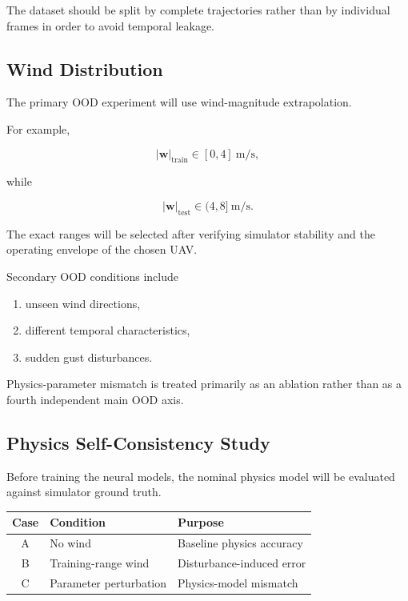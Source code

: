 \documentclass[conference]{IEEEtran}
\begin{document}
The dataset should be split by complete trajectories rather than by
individual frames in order to avoid temporal leakage.


\subsection{Wind Distribution}

The primary OOD experiment will use wind-magnitude extrapolation.

For example,

\begin{equation}
|\mathbf{w}|_{\mathrm{train}}
\in [0,4]~\mathrm{m/s},
\end{equation}

while

\begin{equation}
|\mathbf{w}|_{\mathrm{test}}
\in (4,8]~\mathrm{m/s}.
\end{equation}

The exact ranges will be selected after verifying simulator stability
and the operating envelope of the chosen UAV.

Secondary OOD conditions include

\begin{enumerate}
    \item unseen wind directions,
    \item different temporal characteristics,
    \item sudden gust disturbances.
\end{enumerate}

Physics-parameter mismatch is treated primarily as an ablation rather
than as a fourth independent main OOD axis.


\subsection{Physics Self-Consistency Study}

Before training the neural models, the nominal physics model will be
evaluated against simulator ground truth.

\begin{center}
\renewcommand{\arraystretch}{1.15}
\begin{tabular}{c l l}
\toprule
\textbf{Case} & \textbf{Condition} & \textbf{Purpose} \\
\midrule
A & No wind & Baseline physics accuracy \\
B & Training-range wind & Disturbance-induced error \\
C & Parameter perturbation & Physics-model mismatch \\
\bottomrule
\end{tabular}
\end{center}
\end{document}
